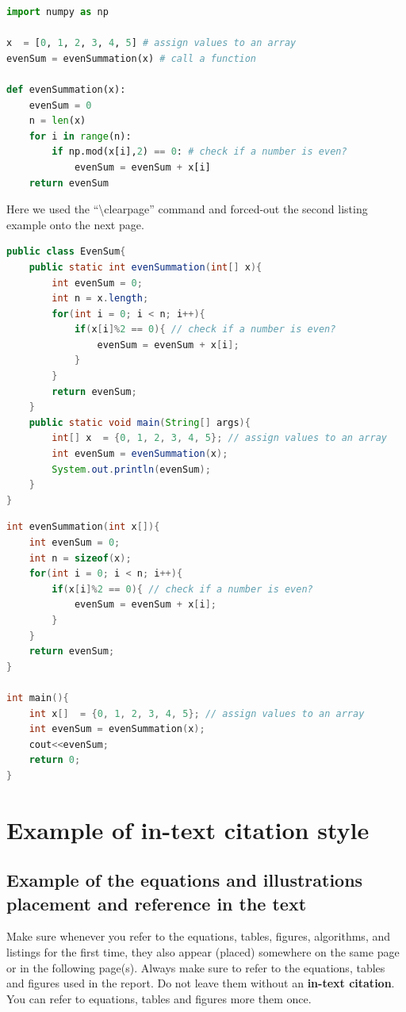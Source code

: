 \begin{lstlisting}[language=Python, caption={Code snippet in \LaTeX ~and  this is a Python code example}, label=list:python_code_ex]
import numpy as np

x  = [0, 1, 2, 3, 4, 5] # assign values to an array
evenSum = evenSummation(x) # call a function

def evenSummation(x):
    evenSum = 0
    n = len(x)
    for i in range(n):
        if np.mod(x[i],2) == 0: # check if a number is even?
            evenSum = evenSum + x[i]
    return evenSum
\end{lstlisting}

Here we used  the ``\textbackslash clearpage'' command and forced-out the second listing example onto the next page. 
\clearpage  %
\begin{lstlisting}[language=Java, caption={Code snippet in \LaTeX ~and  this is a Java code example}, label=list:java_code_ex]
public class EvenSum{ 
    public static int evenSummation(int[] x){
        int evenSum = 0;
        int n = x.length;
        for(int i = 0; i < n; i++){
            if(x[i]%2 == 0){ // check if a number is even?
                evenSum = evenSum + x[i];
            }
        }
        return evenSum;     
    }
    public static void main(String[] args){ 
        int[] x  = {0, 1, 2, 3, 4, 5}; // assign values to an array
        int evenSum = evenSummation(x);
        System.out.println(evenSum);
    } 
} 
\end{lstlisting}


\begin{lstlisting}[language=C, caption={Code snippet in \LaTeX ~and  this is a C/C++ code example}, label=list:cpp_code_ex]
int evenSummation(int x[]){
    int evenSum = 0;
    int n = sizeof(x);
    for(int i = 0; i < n; i++){
        if(x[i]%2 == 0){ // check if a number is even?
            evenSum = evenSum + x[i];
    	}
    }
    return evenSum;     
}

int main(){
    int x[]  = {0, 1, 2, 3, 4, 5}; // assign values to an array
    int evenSum = evenSummation(x);
    cout<<evenSum;
    return 0;
}
\end{lstlisting}



\section{Example of in-text citation style}
\subsection{Example of the equations and illustrations placement and reference in the text}
Make sure whenever you refer to the equations, tables, figures, algorithms,  and listings for the first time, they also appear (placed) somewhere on the same page or in the following page(s). Always make sure to refer to the equations, tables and figures used in the report. Do not leave them without an \textbf{in-text citation}. You can refer to equations, tables and figures more them once.

